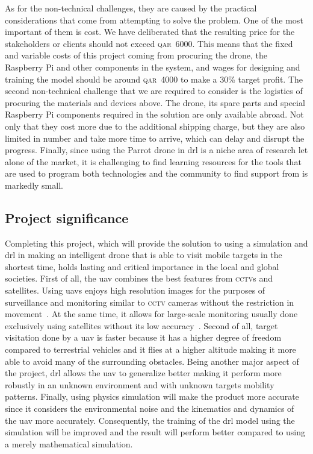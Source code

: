 \documentclass[../main.tex]{subfiles}
\begin{document}
As for the non-technical challenges, they are caused
by the practical considerations that come
from attempting to solve the problem.
One of the most important of them is cost. 
We have deliberated that
the resulting price for the stakeholders or clients
should not exceed \textsc{qar}~6000. 
This means that the fixed and variable costs of this project
coming from procuring the \anafi drone, the Raspberry Pi and other
components in the system, 
and wages for designing and training the model
should be around \textsc{qar}~4000 to make a 30\% target profit.
The second non-technical challenge that we are required to consider
is the logistics of procuring the materials and devices above.
The \anafi drone, its spare parts and special Raspberry Pi
components required in the solution are only available abroad.
Not only that they cost more due to the additional shipping charge,
but they are also limited in number 
and take more time to arrive, which can delay 
and disrupt the progress.
Finally, since using the Parrot \anafi drone in \gls{drl}
is a niche area of research let alone of the market,
it is challenging to find learning resources for the tools
that are used to program both technologies
and the community to find support from is markedly small.

\subsection{Project significance}

Completing this project, which will provide the solution
to using a simulation and \gls{drl} in making an intelligent drone 
that is able to visit mobile targets in the shortest time,
holds lasting and critical importance 
in the local and global societies.
First of all, the \gls{uav} combines the best features
from \textsc{cctv}s and satellites.
Using \glspl{uav} enjoys high resolution images
for the purposes of surveillance and monitoring
similar to \textsc{cctv} cameras 
without the restriction in movement~\cite{Sha19}.
At the same time, it allows for large-scale monitoring 
usually done exclusively using satellites 
without its low accuracy~\cite{Sha19}.
Second of all, target visitation done by a \gls{uav}
is faster because it has a higher degree of freedom
compared to terrestrial vehicles and
it flies at a higher altitude 
making it more able to avoid 
many of the surrounding obstacles.
Being another major aspect of the project, \gls{drl} 
allows the \gls{uav} to generalize better
making it perform more robustly
in an unknown environment
and with unknown targets mobility patterns.
Finally, using physics simulation will make the product 
more accurate since it considers 
the environmental noise and
the kinematics and dynamics of the \gls{uav} more accurately.
Consequently, the training of the \gls{drl} model 
using the simulation will be improved 
and the result will perform better
compared to using a merely mathematical simulation.
\end{document}
